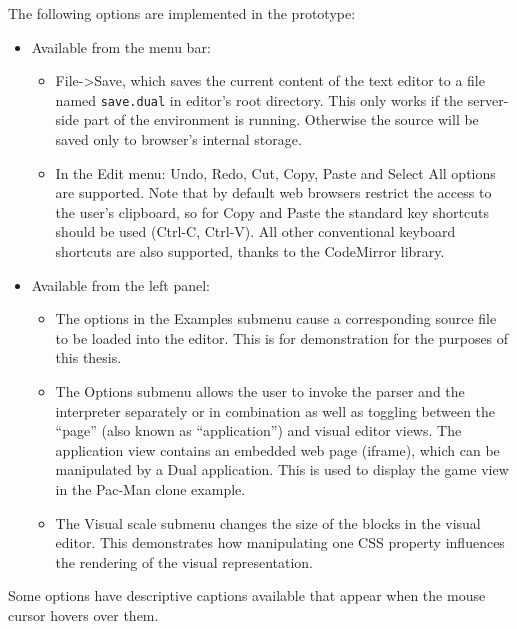 The following options are implemented in the prototype:
\begin{itemize}
    \item Available from the menu bar:
    \begin{itemize}
        \item File->Save, which saves the current content of the text editor to a file named \texttt{save.dual} in editor's root directory. This only works if the server-side part of the environment is running. Otherwise the source will be saved only to browser's internal storage.
        \item In the Edit menu: Undo, Redo, Cut, Copy, Paste and Select All options are supported. Note that by default web browsers restrict the access to the user's clipboard, so for Copy and Paste the standard key shortcuts should be used (Ctrl-C, Ctrl-V). All other conventional keyboard shortcuts are also supported, thanks to the CodeMirror library.
    \end{itemize}
    \item Available from the left panel:
    \begin{itemize}
        \item The options in the Examples submenu cause a corresponding source file to be loaded into the editor. This is for demonstration for the purposes of this thesis.
        \item The Options submenu allows the user to invoke the parser and the interpreter separately or in combination as well as toggling between the ``page'' (also known as ``application'') and visual editor views. The application view contains an embedded web page (iframe), which can be manipulated by a Dual application. This is used to display the game view in the Pac-Man clone example.
        \item The Visual scale submenu changes the size of the blocks in the visual editor. This demonstrates how manipulating one CSS property influences the rendering of the visual representation.
    \end{itemize}
\end{itemize}

Some options have descriptive captions available that appear when the mouse cursor hovers over them.

